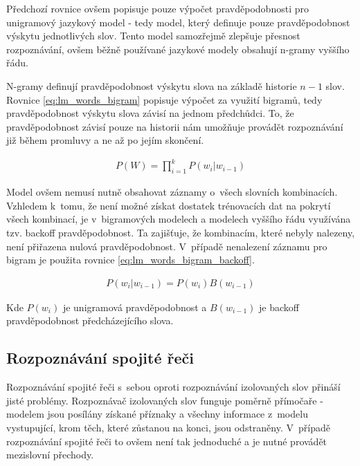 Předchozí rovnice ovšem popisuje pouze výpočet pravděpodobnosti pro unigramový jazykový model - tedy model, který definuje pouze pravděpodobnost výskytu jednotlivých slov. Tento model samozřejmě zlepšuje přesnost rozpoznávání, ovšem běžně používané jazykové modely obsahují n-gramy vyššího řádu.

N-gramy definují pravděpodobnost výskytu slova na základě historie $n - 1$ slov. Rovnice \ref{eq:lm_words_bigram} popisuje výpočet za využití bigramů, tedy pravděpodobnost výskytu slova závisí na jednom předchůdci. To, že pravděpodobnost závisí pouze na historii nám umožňuje provádět rozpoznávání již během promluvy a ne až po jejím skončení.

\begin{equation} \label{eq:lm_words_bigram}
\begin{gathered}
P(W) = \prod^{k}_{i = 1}P(w_i | w_{i - 1})
\end{gathered}
\end{equation}

Model ovšem nemusí nutně obsahovat záznamy o~všech slovních kombinacích. Vzhledem k~tomu, že není možné získat dostatek trénovacích dat na pokrytí všech kombinací, je v~bigramových modelech a modelech vyššího řádu využívána tzv. backoff pravděpodobnost. Ta zajišťuje, že kombinacím, které nebyly nalezeny, není přiřazena nulová pravděpodobnost. V~případě nenalezení záznamu pro bigram je použita rovnice \ref{eq:lm_words_bigram_backoff}.

\begin{equation} \label{eq:lm_words_bigram_backoff}
\begin{gathered}
P(w_i|w_{i - 1}) = P(w_i)B(w_{i - 1})
\end{gathered}
\end{equation}

Kde $P(w_i)$ je unigramová pravděpodobnost a $B(w_{i - 1})$ je backoff pravděpodobnost předcházejícího slova.
\subsection{Rozpoznávání spojité řeči}\label{sec:continuous_speech}
Rozpoznávání spojité řeči s~sebou oproti rozpoznávání izolovaných slov přináší jisté problémy. Rozpoznávač izolovaných slov funguje poměrně přímočaře - modelem jsou posílány získané příznaky a všechny informace z~modelu vystupující, krom těch, které zůstanou na konci, jsou odstraněny. V~případě rozpoznávání spojité řeči to ovšem není tak jednoduché a je nutné provádět mezislovní přechody.

